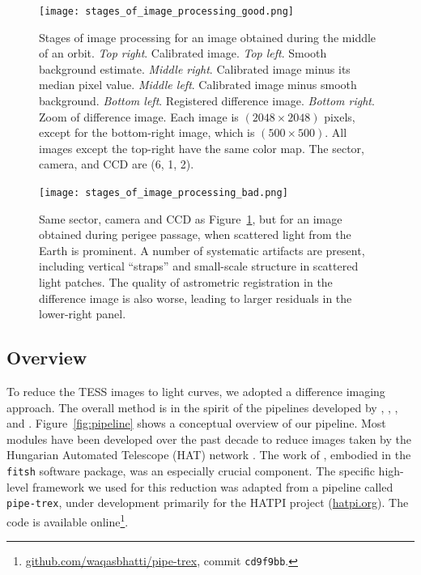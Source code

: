 \documentclass[12pt,twocolumn,tighten]{aastex62}
\begin{document}
\begin{figure}[!t]
    \begin{center}
        \leavevmode
        \texttt{[image: stages\_of\_image\_processing\_good.png]}
    \end{center}
    \vspace{-0.6cm}
    \caption{
        Stages of image processing for an image obtained during the middle
        of an orbit.
        {\it Top right}. Calibrated image.
        {\it Top left}. Smooth background estimate.
        {\it Middle right}. Calibrated image minus its median pixel value.
        {\it Middle left}. Calibrated image minus smooth background.
        {\it Bottom left}. Registered difference image.
        {\it Bottom right}. Zoom of difference image.
        Each image is $(2048\times2048)$ pixels, except for the
        bottom-right image, which is $(500\times500)$.  All images
        except the top-right have the same color map.  The sector,
        camera, and CCD are (6, 1, 2).
        \label{fig:stages_good}
    }
\end{figure}

\begin{figure}[!t]
    \begin{center}
        \leavevmode
        \texttt{[image: stages\_of\_image\_processing\_bad.png]}
    \end{center}
    \vspace{-0.6cm}
    \caption{
        Same sector, camera and CCD as Figure~\ref{fig:stages_good},
        but for an image obtained during perigee passage, when
        scattered light from the Earth is prominent.  A number of
        systematic artifacts are present, including vertical
        ``straps'' and small-scale structure in scattered light
        patches.  The quality of astrometric registration in the
        difference image is also worse, leading to larger residuals in
        the lower-right panel.
        \label{fig:stages_bad}
    }
\end{figure}

\subsection{Overview}

To reduce the TESS images to light curves, we adopted a difference
imaging approach.  The overall method is in the spirit of the
pipelines developed by \citet{Pal_2009},
\citet{huang_high-precision_2015}, \citet{soares-furtado_image_2017},
\citet{oelkers_precision_2018} and \citet{wallace_search_2019}.
Figure~\ref{fig:pipeline} shows a conceptual overview of our pipeline.
Most modules have been developed over the past decade to reduce images
taken by the Hungarian Automated Telescope (HAT) network
\citep{bakos_hat_review_2018}.  The work of \citet{Pal_2009}, embodied
in the \texttt{fitsh} software package, was an especially crucial
component.  The specific high-level framework we used for this
reduction was adapted from a pipeline called \texttt{pipe-trex}, under
development primarily for the HATPI project (\url{hatpi.org}).  The
code is available
online\footnote{\url{github.com/waqasbhatti/pipe-trex}, commit
\texttt{cd9f9bb}.}.
\end{document}
